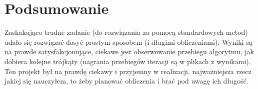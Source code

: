 \documentclass{article}
\begin{document}
\begin{figure}[H]
  \centering
  \hfill
\end{figure}
\section{Podsumowanie}
Zaskakująco trudne zadanie (do rozwiązania za pomocą standardowych metod) udało się rozwiązać dosyć prostym sposobem (i długimi obliczeniami). Wyniki są na prawde satysfakcjonujące, ciekawe jest obserwowanie przebiegu algorytmu, jak dobiera kolejne trójkąty (nagrania przebiegów iteracji są w plikach z wynikami).\\
Ten projekt był na prawdę ciekawy i przyjemny w realizacji, najważniejsza rzecz jakiej się nauczyłem, to żeby planować obliczenia i brać pod uwagę ich długość.
\end{document}
